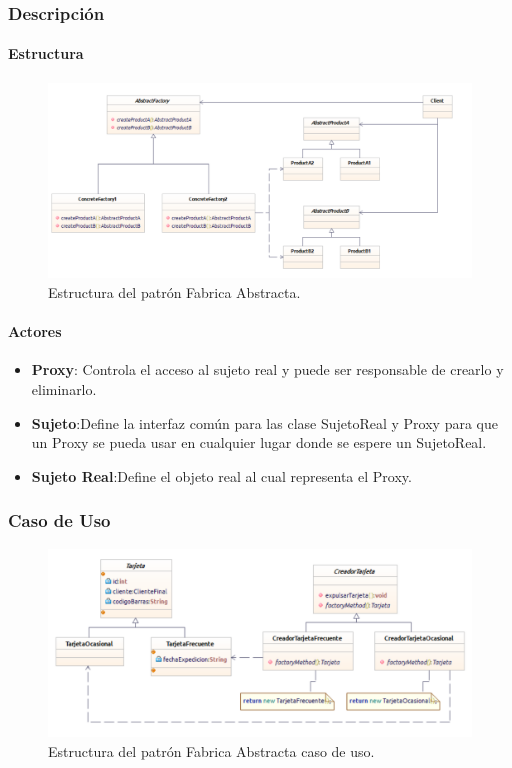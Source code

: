 \subsubsection{Descripción}

\paragraph{Estructura}

\begin{figure}[th!]
	\centering
	\includegraphics[width=.7\linewidth]{imagenes/Patrones/Fabrica.pdf}
	\caption{Estructura del patrón Fabrica Abstracta.\cite{gof}}	
\end{figure}

\paragraph{Actores}

\begin{itemize}
	\item \textbf{Proxy}: Controla el acceso al sujeto real y puede ser responsable de crearlo y eliminarlo.
	\item \textbf{Sujeto}:Define la interfaz común para las clase SujetoReal y Proxy para que un Proxy se pueda usar en cualquier lugar donde se espere un SujetoReal.
	\item \textbf{Sujeto Real}:Define el objeto real al cual representa el Proxy.
\end{itemize}


\subsubsection{Caso de Uso}
\begin{figure}[th!]
	\centering
	\includegraphics[width=.7\linewidth]{imagenes/Patrones/Fabrica_caso.pdf}
	\caption{Estructura del patrón Fabrica Abstracta caso de uso.\cite{gof}}	
\end{figure}

